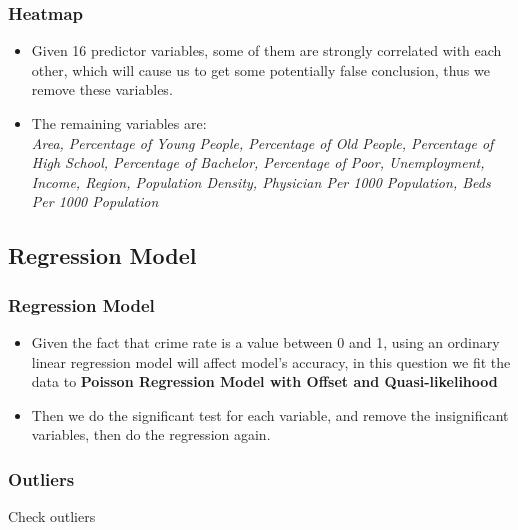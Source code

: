 \documentclass{beamer}
\begin{document}
\begin{frame}[fragile]
\frametitle{Heatmap}
\begin{itemize}
\item Given 16 predictor variables, some of them are strongly correlated with each other, which will cause us to get some potentially false conclusion, thus we remove these variables.
\item The remaining variables are:\\
\textsl{Area, Percentage of Young People, Percentage of Old People, Percentage of High School, Percentage of Bachelor, Percentage of Poor, Unemployment, Income,  Region, Population Density, Physician Per 1000 Population, Beds Per 1000 Population}
\end{itemize}
\end{frame}


\subsection{Regression Model}
\begin{frame}[fragile]
\frametitle{Regression Model}
\begin{itemize}
\item Given the fact that crime rate is a value between 0 and 1, using an ordinary linear regression model will affect model's accuracy, in this question we fit the data to \textbf{Poisson Regression Model with Offset and Quasi-likelihood}
\item Then we do the significant test for each variable, and remove the insignificant variables, then do the regression again.
\end{itemize}

\end{frame}

\begin{frame}[fragile]
\frametitle{Outliers}
Check outliers

\begin{center}
\end{center}

\end{frame}
\end{document}
